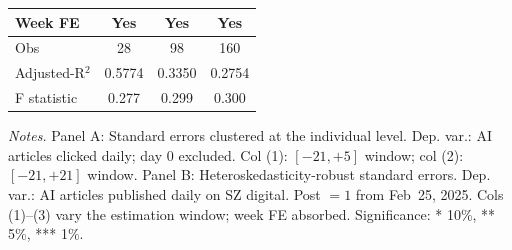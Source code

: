 \begin{table}[H]
\begin{tabular}{l*{3}{c}}
Week FE & Yes & Yes & Yes \\
\midrule
Obs &         28 &         98 &        160 \\
Adjusted-R$^2$ &     0.5774 &     0.3350 &     0.2754 \\
F statistic &      0.277 &      0.299 &      0.300 \\
\bottomrule
\end{tabular}
 \par
 \begin{minipage}{0.98\linewidth}
 \baselineskip9pt {\scriptsize \vspace{0.1cm} { \it Notes.} Panel A: Standard errors clustered at the individual level. Dep. var.: AI articles clicked daily; day 0 excluded. Col (1): $[-21,+5]$ window; col (2): $[-21,+21]$ window. Panel B: Heteroskedasticity-robust standard errors. Dep. var.: AI articles published daily on SZ digital. Post $=1$ from Feb~25, 2025. Cols (1)--(3) vary the estimation window; week FE absorbed. Significance: * 10\%, ** 5\%, *** 1\%.}
 \end{minipage}
 \end{table}
